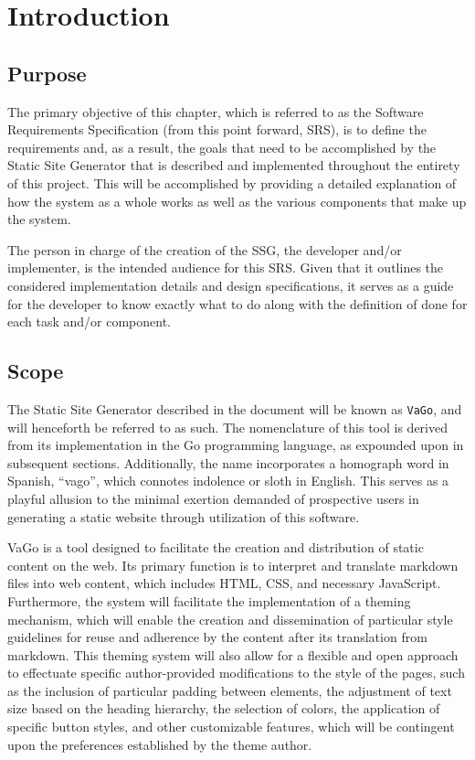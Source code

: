 
\section{Introduction}\label{subsec:ssg-introduction}

\subsection{Purpose}\label{subsubsec:purpose}

The primary objective of this chapter, which is referred to as the
Software Requirements Specification\cite{srs} (from this point forward, SRS), is
to define the requirements and, as a result, the goals that need to be
accomplished by the Static Site Generator\cite{cloudflare,wikissg} that is described and
implemented throughout the entirety of this project. This will be
accomplished by providing a detailed explanation of how the system as a
whole works as well as the various components that make up the system.

The person in charge of the creation of the SSG, the developer and/or
implementer, is the intended audience for this SRS. Given that it
outlines the considered implementation details and design
specifications, it serves as a guide for the developer to know exactly
what to do along with the definition of done for each task and/or
component.

\subsection{Scope}\label{subsubsec:scope}

The Static Site Generator described in the document will be known as
\texttt{VaGo}, and will henceforth be referred to as such. The
nomenclature of this tool is derived from its implementation in the Go
programming language\cite{donovan2015go}, as expounded upon in subsequent sections.
Additionally, the name incorporates a homograph word in Spanish,
``vago'', which connotes indolence or sloth in English. This serves as a
playful allusion to the minimal exertion demanded of prospective users
in generating a static website through utilization of this software.

VaGo is a tool designed to facilitate the creation and distribution of
static content on the web. Its primary function is to interpret and
translate markdown files into web content, which includes HTML, CSS, and
necessary JavaScript. Furthermore, the system will facilitate the
implementation of a theming mechanism, which will enable the creation
and dissemination of particular style guidelines for reuse and adherence
by the content after its translation from markdown. This theming system
will also allow for a flexible and open approach to effectuate specific
author-provided modifications to the style of the pages, such as the
inclusion of particular padding between elements, the adjustment of text
size based on the heading hierarchy, the selection of colors, the
application of specific button styles, and other customizable features,
which will be contingent upon the preferences established by the theme
author.

